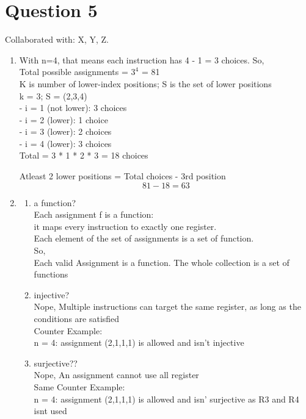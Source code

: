 \documentclass[twoside]{article}
\begin{document}
\newpage

\section*{Question 5}
Collaborated with: X, Y, Z.
\begin{enumerate}
    \item[(a)]  With n=4, that means each instruction has 4 - 1 = 3 choices. So, \\
                Total possible assignments = $3^{4}$ = 81  \\
                K is number of lower-index positions; S is the set of lower positions \\
                k = 3; S = (2,3,4) \\
                    - i = 1 (not lower): 3 choices \\
                    - i = 2 (lower): 1 choice \\
                    - i = 3 (lower): 2 choices \\
                    - i = 4 (lower): 3 choices \\
                    Total = 3 * 1 * 2 * 3 = 18 choices 

                Atleast 2 lower positions = Total choices - 3rd position
                \[81 -18 = 63\]

    
    \item[(b)]
        \begin{enumerate}
            \item[(i)]   a function? \\
                         Each assignment f is a function: \\
                         it maps every instruction to exactly one register. \\
                         Each element of the set of assignments is a set of function. \\
                         So, \\
                         Each valid Assignment is a function. The whole collection is a set of functions
            \item[(ii)]  injective? \\
                         Nope, Multiple instructions can target the same register, as long as the conditions are satisfied \\
                         Counter Example: \\
                            n = 4: assignment (2,1,1,1) is allowed and isn't injective
            \item[(iii)] surjective?? \\
                         Nope, An assignment cannot use all register \\
                         Same Counter Example: \\
                            n = 4: assignment (2,1,1,1) is allowed and isn' surjective as R3 and R4 isnt used
        \end{enumerate} 


\end{enumerate}
\end{document}
